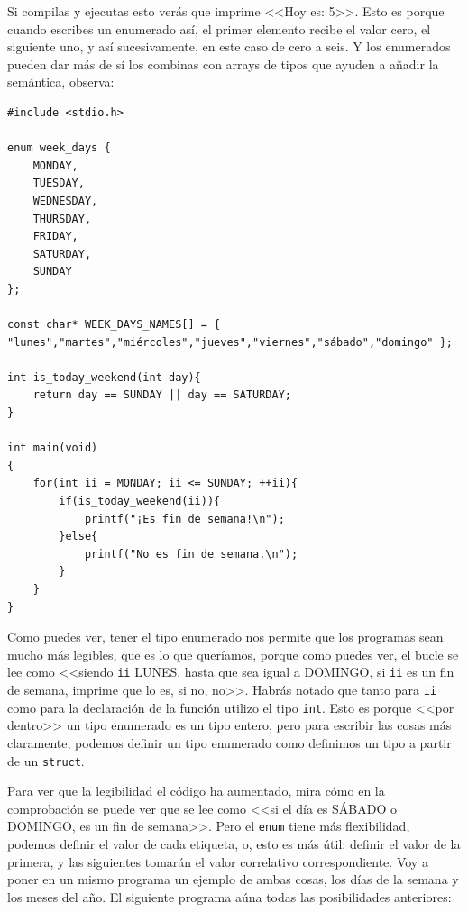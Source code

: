 \documentclass[a4paper]{article}
\begin{document}
Si compilas y ejecutas esto verás que imprime <<Hoy es: 5>>. Esto es porque
cuando escribes un enumerado así, el primer elemento recibe el valor cero, el
siguiente uno, y así sucesivamente, en este caso de cero a seis.
Y los enumerados pueden dar más de sí los combinas con arrays de tipos que
ayuden a añadir la semántica, observa:


\noindent
\begin{minipage}[H]{\linewidth}
\mbox{}
\begin{lstlisting}[style=C,
caption={Enum combinado con array de nombres},
label={lst:EnumWithNames}]
#include <stdio.h>

enum week_days {
    MONDAY,
    TUESDAY,
    WEDNESDAY,
    THURSDAY,
    FRIDAY,
    SATURDAY,
    SUNDAY
};

const char* WEEK_DAYS_NAMES[] = { "lunes","martes","miércoles","jueves","viernes","sábado","domingo" };

int is_today_weekend(int day){
    return day == SUNDAY || day == SATURDAY;
}

int main(void)
{
    for(int ii = MONDAY; ii <= SUNDAY; ++ii){
        if(is_today_weekend(ii)){
            printf("¡Es fin de semana!\n");
        }else{
            printf("No es fin de semana.\n");
        }
    }
}
\end{lstlisting}
\end{minipage}

Como puedes ver, tener el tipo enumerado nos permite que los programas sean
mucho más legibles, que es lo que queríamos, porque como puedes ver, el bucle
se lee como <<siendo \verb!ii! LUNES, hasta que sea igual a DOMINGO, si
\verb!ii! es un fin de semana, imprime que lo es, si no, no>>. Habrás notado que
tanto para \verb!ii! como para la declaración de la función utilizo el tipo
\verb!int!. Esto es porque <<por dentro>> un tipo enumerado es un tipo entero,
pero para escribir las cosas más claramente, podemos definir un tipo enumerado
como definimos un tipo a partir de un \verb!struct!.

Para ver que la legibilidad el código ha aumentado, mira cómo en la
comprobación se puede ver que se lee como <<si el día es SÁBADO o DOMINGO,
es un fin de semana>>. Pero el \verb!enum! tiene más flexibilidad, podemos
definir el valor de cada etiqueta, o, esto es más útil: definir el valor de la
primera, y las siguientes tomarán el valor correlativo correspondiente. Voy
a poner en un mismo programa un ejemplo de ambas cosas, los días de la semana
y los meses del año. El siguiente programa aúna todas las posibilidades
anteriores:
\end{document}
